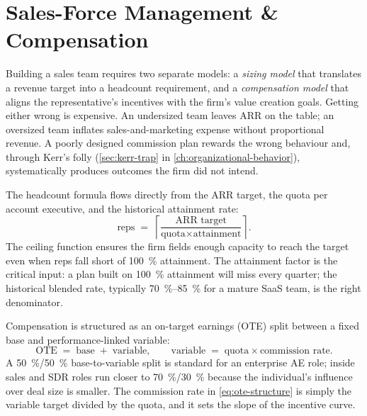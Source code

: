 \section{Sales-Force Management \& Compensation}\label{sec:salesforce-management}

Building a sales team requires two separate models: a \textit{sizing model} that translates
a revenue target into a headcount requirement, and a \textit{compensation model} that aligns
the representative's incentives with the firm's value creation goals. Getting either wrong
is expensive. An undersized team leaves ARR on the table; an oversized team inflates
sales-and-marketing expense without proportional revenue. A poorly designed commission plan
rewards the wrong behaviour and, through Kerr's folly (\cref{sec:kerr-trap} in
\cref{ch:organizational-behavior}), systematically produces outcomes the
firm did not intend.

The headcount formula flows directly from the ARR target, the quota per account executive,
and the historical attainment rate:
\begin{equation}\label{eq:sales-productivity}
  \text{reps} \;=\;
    \left\lceil\frac{\text{ARR target}}{\text{quota}\times\text{attainment}}\right\rceil.
\end{equation}
The ceiling function ensures the firm fields enough capacity to reach the target even when
reps fall short of \qty{100}{\percent} attainment. The attainment factor is the critical
input: a plan built on \qty{100}{\percent} attainment will miss every quarter; the
historical blended rate, typically \qty{70}{\percent}--\qty{85}{\percent} for a mature SaaS
team, is the right denominator.

Compensation is structured as an on-target earnings (OTE) split between a fixed base and
performance-linked variable:
\begin{equation}\label{eq:ote-structure}
  \text{OTE} \;=\; \text{base} \;+\; \text{variable}, \qquad
  \text{variable} \;=\; \text{quota} \times \text{commission rate}.
\end{equation}
A \qty{50}{\percent}/\qty{50}{\percent} base-to-variable split is standard for an
enterprise AE role; inside sales and SDR roles run closer to \qty{70}{\percent}/\qty{30}{\percent}
because the individual's influence over deal size is smaller. The commission rate in
\cref{eq:ote-structure} is simply the variable target divided by the quota, and it sets the
slope of the incentive curve.

